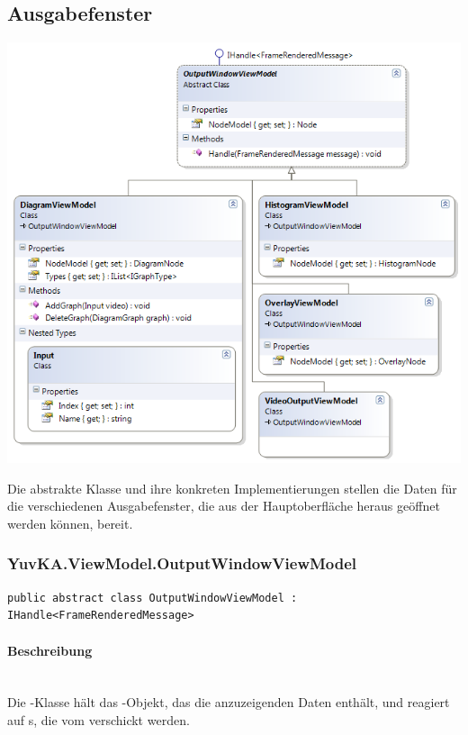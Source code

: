 \subsection{Ausgabefenster}
\begin{center}\includegraphics[scale=0.7]{YuvKA.ViewModel/outputs.png} \\
\end{center}
Die abstrakte Klasse  und ihre konkreten Implementierungen stellen die Daten für die verschiedenen Ausgabefenster, die aus der Hauptoberfläche heraus geöffnet werden können, bereit.

\subsubsection{YuvKA.ViewModel.OutputWindowViewModel}

\begin{verbatim}
public abstract	class OutputWindowViewModel : IHandle<FrameRenderedMessage>
\end{verbatim}

\paragraph{Beschreibung}~\\
Die -Klasse hält das -Objekt, das die anzuzeigenden Daten enthält, und reagiert auf s, die vom  verschickt werden.

